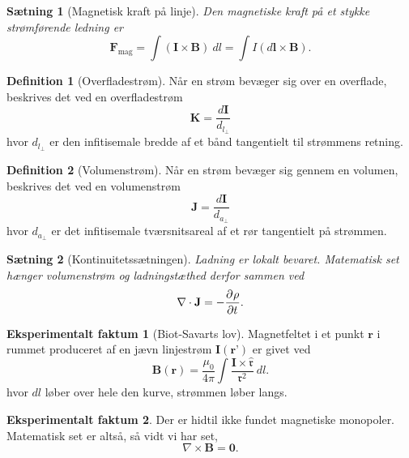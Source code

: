 \documentclass[]{article}
\newcommand{\fr}{\mathfrak{r}}
\newcommand{\hfr}{\hat{\mathfrak{r}}}
\newtheorem{theorem}{Sætning}
\theoremstyle{definition}
\newtheorem{definition}{Definition}
\newtheorem{experimental}{Eksperimentalt faktum}
\begin{document}
\begin{theorem}[Magnetisk kraft på linje]
	Den magnetiske kraft på et stykke strømførende ledning er
	\begin{equation*}
		\mathbf{F}_\text{mag} = \int(\mathbf{I} \times \mathbf{B}) \ dl = \int I (d\mathbf{l} \times \mathbf{B}).
	\end{equation*}
\end{theorem}

\begin{definition}[Overfladestrøm]
	Når en strøm bevæger sig over en overflade, beskrives det ved en overfladestrøm
	\begin{equation*}
		\mathbf{K} = \dfrac{d\mathbf{I}}{d_{l_\perp}}
	\end{equation*}
	hvor $d_{l_\perp}$ er den infitisemale bredde af et bånd tangentielt til strømmens retning.
\end{definition}

\begin{definition}[Volumenstrøm]
	Når en strøm bevæger sig gennem en volumen, beskrives det ved en volumenstrøm
	\begin{equation*}
		\mathbf{J} = \dfrac{d\mathbf{I}}{d_{a_\perp}}
	\end{equation*}
	hvor $d_{a_\perp}$ er det infitisemale tværsnitsareal af et rør tangentielt på strømmen.
\end{definition}

\begin{theorem}[Kontinuitetssætningen]
	Ladning er lokalt bevaret. Matematisk set hænger volumenstrøm og ladningstæthed derfor sammen ved
	\begin{equation*}
		\nabla \cdot \mathbf{J} = -\frac{\partial^{} \rho}{\partial t ^{}}.
	\end{equation*}
\end{theorem}

\begin{experimental}[Biot-Savarts lov]
	Magnetfeltet i et punkt $\mathbf{r}$ i rummet produceret af en jævn linjestrøm $\mathbf{I}(\textbf{r'})$ er givet ved
	\begin{equation*}
		\mathbf{B}(\mathbf{r}) = \frac{\mu_0}{4 \pi} \int{\frac{\mathbf{I} \times \hfr}{\fr^2}} \ dl.
	\end{equation*}
	hvor $dl$ løber over hele den kurve, strømmen løber langs.
\end{experimental}

\begin{experimental}
	Der er hidtil ikke fundet magnetiske monopoler. Matematisk set er altså, så vidt vi har set,
	\begin{equation*}
		\nabla \times \mathbf{B} = \mathbf{0}.
	\end{equation*}
\end{experimental}
\end{document}
